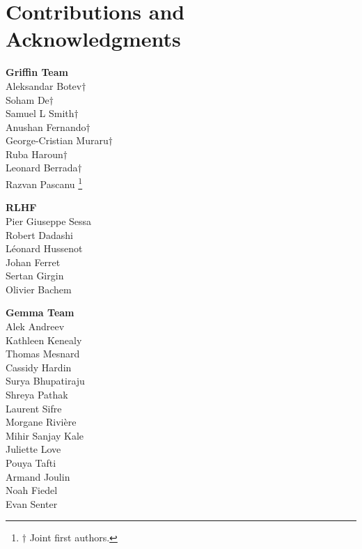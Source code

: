 
\section{Contributions and Acknowledgments}

\noindent\textbf{Griffin Team} \\
Aleksandar Botev\begin{math}\dagger{}\end{math} \\
Soham De\begin{math}\dagger{}\end{math} \\
Samuel L Smith\begin{math}\dagger{}\end{math} \\
Anushan Fernando\begin{math}\dagger{}\end{math} \\
George-Cristian Muraru\begin{math}\dagger{}\end{math} \\
Ruba Haroun\begin{math}\dagger{}\end{math} \\
Leonard Berrada\begin{math}\dagger{}\end{math} \\
Razvan Pascanu
{\let\thefootnote\relax\footnote{\begin{math}\dagger{}\end{math} Joint first authors.}}

\noindent\textbf{RLHF} \\
Pier Giuseppe Sessa \\
Robert Dadashi \\
Léonard Hussenot \\
Johan Ferret \\
Sertan Girgin \\
Olivier Bachem

\noindent\textbf{Gemma Team} \\
Alek Andreev \\
Kathleen Kenealy \\
Thomas Mesnard \\
Cassidy Hardin \\
Surya Bhupatiraju \\
Shreya Pathak \\
Laurent Sifre \\
Morgane Rivière \\
Mihir Sanjay Kale \\
Juliette Love \\
Pouya Tafti \\
Armand Joulin \\
Noah Fiedel \\
Evan Senter

